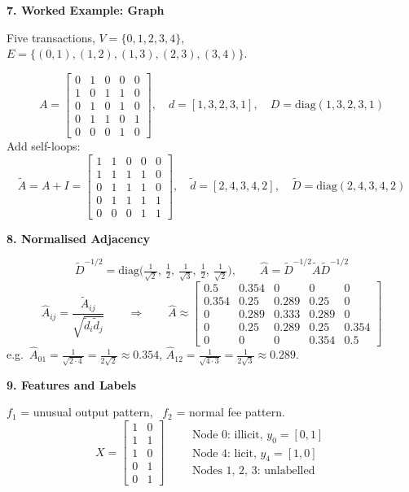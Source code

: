 \documentclass[12pt,a4paper]{article}
\newcommand{\Ahat}{\hat A}
\newcommand{\h}[1]{\par\needspace{6\baselineskip}\medskip\textbf{\large #1}\par}
\begin{document}
\h{7. Worked Example: Graph}
Five transactions, $V = \{0,1,2,3,4\}$, \ $E = \{(0,1), (1,2), (1,3), (2,3), (3,4)\}$.

\begin{center}
\end{center}
\[
  A = \begin{bmatrix}
  0&1&0&0&0\\ 1&0&1&1&0\\ 0&1&0&1&0\\ 0&1&1&0&1\\ 0&0&0&1&0
  \end{bmatrix}, \quad d = [1,3,2,3,1], \quad D = \mathrm{diag}(1,3,2,3,1)
\]
Add self-loops:
\[
  \tilde A = A + I = \begin{bmatrix}
  1&1&0&0&0\\ 1&1&1&1&0\\ 0&1&1&1&0\\ 0&1&1&1&1\\ 0&0&0&1&1
  \end{bmatrix}, \quad \tilde d = [2,4,3,4,2], \quad \tilde D = \mathrm{diag}(2,4,3,4,2)
\]

\h{8. Normalised Adjacency}
\[
  \tilde D^{-1/2} = \mathrm{diag}\Big(\tfrac{1}{\sqrt2},\ \tfrac12,\ \tfrac{1}{\sqrt3},\ \tfrac12,\ \tfrac{1}{\sqrt2}\Big),
  \qquad \Ahat = \tilde D^{-1/2}\tilde A\tilde D^{-1/2}
\]
\[
  \Ahat_{ij} = \frac{\tilde A_{ij}}{\sqrt{\tilde d_i \tilde d_j}}
  \qquad\Rightarrow\qquad
  \Ahat \approx \begin{bmatrix}
  0.5 & 0.354 & 0 & 0 & 0\\
  0.354 & 0.25 & 0.289 & 0.25 & 0\\
  0 & 0.289 & 0.333 & 0.289 & 0\\
  0 & 0.25 & 0.289 & 0.25 & 0.354\\
  0 & 0 & 0 & 0.354 & 0.5
  \end{bmatrix}
\]
e.g.\ $\Ahat_{01} = \frac{1}{\sqrt{2\cdot4}} = \frac{1}{2\sqrt2} \approx 0.354$, \quad
$\Ahat_{12} = \frac{1}{\sqrt{4\cdot3}} = \frac{1}{2\sqrt3} \approx 0.289$.

\h{9. Features and Labels}
$f_1$ = unusual output pattern, \ $f_2$ = normal fee pattern.
\[
  X = \begin{bmatrix} 1&0\\ 1&1\\ 1&0\\ 0&1\\ 0&1 \end{bmatrix}
  \qquad
  \begin{array}{l}
  \text{Node 0: illicit, } y_0 = [0, 1]\\
  \text{Node 4: licit, } y_4 = [1, 0]\\
  \text{Nodes 1, 2, 3: unlabelled}
  \end{array}
\]
\end{document}

